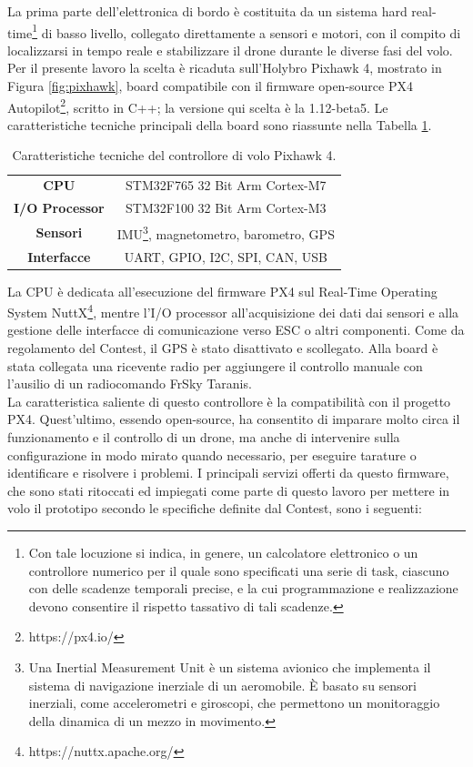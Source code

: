 \indent La prima parte dell'elettronica di bordo è costituita da un sistema hard real-time\footnote{Con tale locuzione si indica, in genere, un calcolatore elettronico o un controllore numerico per il quale sono specificati una serie di task, ciascuno con delle scadenze temporali precise, e la cui programmazione e realizzazione devono consentire il rispetto tassativo di tali scadenze.} di basso livello, collegato direttamente a sensori e motori, con il compito di localizzarsi in tempo reale e stabilizzare il drone durante le diverse fasi del volo. Per il presente lavoro la scelta è ricaduta sull'Holybro Pixhawk 4, mostrato in Figura \ref{fig:pixhawk}, board compatibile con il firmware open-source PX4 Autopilot\footnote{https://px4.io/}, scritto in C++; la versione qui scelta è la 1.12-beta5. Le caratteristiche tecniche principali della board sono riassunte nella Tabella \ref{tab:pix}.\\
\begin{table}
    \centering
    \begin{tabular}{c|c}
        \textbf{CPU} & STM32F765 32 Bit Arm Cortex-M7 \\
        \textbf{I/O Processor} & STM32F100 32 Bit Arm Cortex-M3 \\
        \textbf{Sensori} & IMU\footnote{Una Inertial Measurement Unit è un sistema avionico che implementa il sistema di navigazione inerziale di un aeromobile. È basato su sensori inerziali, come accelerometri e giroscopi, che permettono un monitoraggio della dinamica di un mezzo in movimento.}, magnetometro, barometro, GPS\\
        \textbf{Interfacce} & UART, GPIO, I2C, SPI, CAN, USB
    \end{tabular}
    \caption{Caratteristiche tecniche del controllore di volo Pixhawk 4.}
    \label{tab:pix}
\end{table}
La CPU è dedicata all'esecuzione del firmware PX4 sul Real-Time Operating System NuttX\footnote{https://nuttx.apache.org/}, mentre l'I/O processor all'acquisizione dei dati dai sensori e alla gestione delle interfacce di comunicazione verso ESC o altri componenti. Come da regolamento del Contest, il GPS è stato disattivato e scollegato. Alla board è stata collegata una ricevente radio per aggiungere il controllo manuale con l'ausilio di un radiocomando FrSky Taranis.\\
La caratteristica saliente di questo controllore è la compatibilità con il progetto PX4. Quest'ultimo, essendo open-source, ha consentito di imparare molto circa il funzionamento e il controllo di un drone, ma anche di intervenire sulla configurazione in modo mirato quando necessario, per eseguire tarature o identificare e risolvere i problemi. I principali servizi offerti da questo firmware, che sono stati ritoccati ed impiegati come parte di questo lavoro per mettere in volo il prototipo secondo le specifiche definite dal Contest, sono i seguenti:
